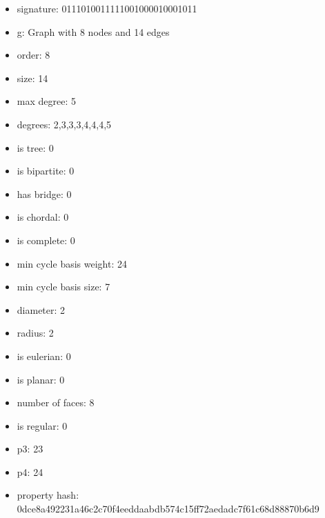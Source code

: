 \begin{itemize}
\item signature: 0111010011111001000010001011
\item g: Graph with 8 nodes and 14 edges
\item order: 8
\item size: 14
\item max degree: 5
\item degrees: 2,3,3,3,4,4,4,5
\item is tree: 0
\item is bipartite: 0
\item has bridge: 0
\item is chordal: 0
\item is complete: 0
\item min cycle basis weight: 24
\item min cycle basis size: 7
\item diameter: 2
\item radius: 2
\item is eulerian: 0
\item is planar: 0
\item number of faces: 8
\item is regular: 0
\item p3: 23
\item p4: 24
\item property hash: 0dce8a492231a46c2c70f4eeddaabdb574c15ff72aedadc7f61c68d88870b6d9
\end{itemize}
\newpage
\begin{figure}
\end{figure}
